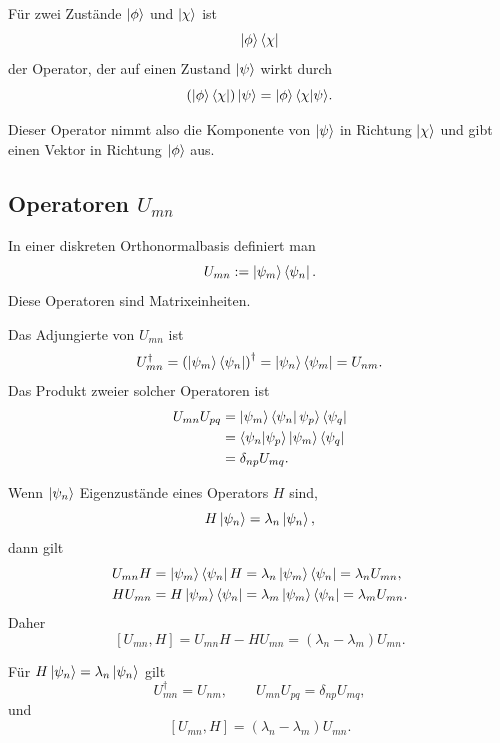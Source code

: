 \begin{definitionbox}
Für zwei Zustände $\left|\phi\right\rangle$ und $\left|\chi\right\rangle$ ist
\[
    \left|\phi\right\rangle\left\langle\chi\right|
\]
der Operator, der auf einen Zustand $\left|\psi\right\rangle$ wirkt durch
\[
    (\left|\phi\right\rangle\left\langle\chi\right|)\left|\psi\right\rangle
    =\left|\phi\right\rangle\langle\chi|\psi\rangle.
\]
\end{definitionbox}

Dieser Operator nimmt also die Komponente von $\left|\psi\right\rangle$ in Richtung $\left|\chi\right\rangle$ und gibt einen Vektor in Richtung $\left|\phi\right\rangle$ aus.

\subsection{Operatoren $U_{mn}$}

In einer diskreten Orthonormalbasis definiert man
\[
    U_{mn}:=\left|\psi_m\right\rangle\left\langle\psi_n\right|.
\]
Diese Operatoren sind Matrixeinheiten.

\begin{derivationbox}
Das Adjungierte von $U_{mn}$ ist
\[
    U_{mn}^\dagger
    =\left(\left|\psi_m\right\rangle\left\langle\psi_n\right|\right)^\dagger
    =\left|\psi_n\right\rangle\left\langle\psi_m\right|
    =U_{nm}.
\]
Das Produkt zweier solcher Operatoren ist
\[
\begin{aligned}
    U_{mn}U_{pq}
    &=\left|\psi_m\right\rangle\left\langle\psi_n\right|\psi_p\rangle\left\langle\psi_q\right| \\
    &=\langle\psi_n|\psi_p\rangle\left|\psi_m\right\rangle\left\langle\psi_q\right| \\
    &=\delta_{np}U_{mq}.
\end{aligned}
\]
\end{derivationbox}

Wenn $\left|\psi_n\right\rangle$ Eigenzustände eines Operators $H$ sind,
\[
    H\left|\psi_n\right\rangle=\lambda_n\left|\psi_n\right\rangle,
\]
dann gilt
\[
\begin{aligned}
    U_{mn}H
    &=\left|\psi_m\right\rangle\left\langle\psi_n\right|H
    =\lambda_n\left|\psi_m\right\rangle\left\langle\psi_n\right|
    =\lambda_n U_{mn}, \\
    HU_{mn}
    &=H\left|\psi_m\right\rangle\left\langle\psi_n\right|
    =\lambda_m\left|\psi_m\right\rangle\left\langle\psi_n\right|
    =\lambda_m U_{mn}.
\end{aligned}
\]
Daher
\[
    [U_{mn},H]=U_{mn}H-HU_{mn}
    = (\lambda_n-\lambda_m)U_{mn}.
\]

\begin{formulabox}
Für $H\left|\psi_n\right\rangle=\lambda_n\left|\psi_n\right\rangle$ gilt
\[
    U_{mn}^\dagger=U_{nm},
    \qquad
    U_{mn}U_{pq}=\delta_{np}U_{mq},
\]
und
\[
    [U_{mn},H]=(\lambda_n-\lambda_m)U_{mn}.
\]
\end{formulabox}


